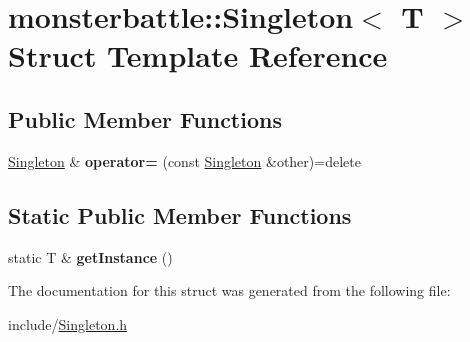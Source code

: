 \hypertarget{structmonsterbattle_1_1Singleton}{}\section{monsterbattle\+:\+:Singleton$<$ T $>$ Struct Template Reference}
\label{structmonsterbattle_1_1Singleton}
\subsection*{Public Member Functions}
\begin{DoxyCompactItemize}
\item 
\mbox{\label{structmonsterbattle_1_1Singleton_a34d423b37412e7f844b3a03bf8b8f3dc}} 
\hyperlink{structmonsterbattle_1_1Singleton}{Singleton} \& {\bfseries operator=} (const \hyperlink{structmonsterbattle_1_1Singleton}{Singleton} \&other)=delete
\end{DoxyCompactItemize}
\subsection*{Static Public Member Functions}
\begin{DoxyCompactItemize}
\item 
\mbox{\label{structmonsterbattle_1_1Singleton_a7c6bbdd2c2bffd10876bec91c201399b}} 
static T \& {\bfseries get\+Instance} ()
\end{DoxyCompactItemize}


The documentation for this struct was generated from the following file\+:\begin{DoxyCompactItemize}
\item 
include/\hyperlink{Singleton_8h}{Singleton.\+h}\end{DoxyCompactItemize}
